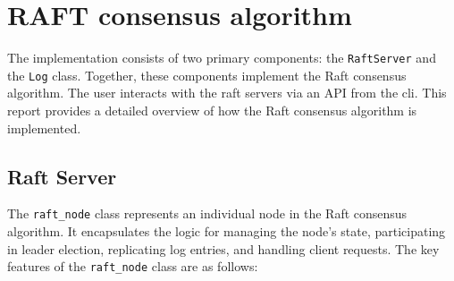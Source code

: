 \documentclass{article}
\begin{document}
\section{RAFT consensus algorithm}
The implementation consists of two primary components: the \texttt{RaftServer} and 
the \texttt{Log} class. Together, these components implement the Raft consensus 
algorithm. The user interacts with the raft servers via an API from the cli. This report provides 
a detailed overview of 
how the Raft consensus algorithm is implemented.

\subsection{Raft Server}

The \texttt{raft\_node} class represents an individual node in the Raft consensus 
algorithm. It encapsulates the logic for managing the node's state, participating in 
leader election, replicating log entries, and handling client requests. The key features 
of the \texttt{raft\_node} class are as follows:
\end{document}
